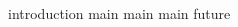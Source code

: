 \documentclass[a4paper,12pt,times,numbered,print,index]{Classes/PhDThesisPSnPDF}
\begin{document}
\frontmatter

\begin{titlepage}
  \maketitle
\end{titlepage}


%
%
%
%


\tableofcontents


\printglossary[type=\acronymtype, title=List of acronyms, toctitle=List of acronyms]

\listoffigures

\listoftables

%

\mainmatter

{introduction}
{main}
{main}
{main}
%
{future}
%
%
%
%




\begin{spacing}{0.9}



\cleardoublepage





\end{spacing}
\end{document}
